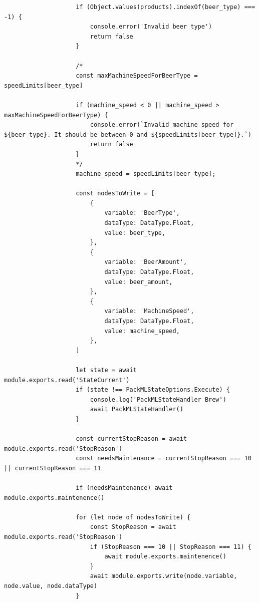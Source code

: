 \begin{center}
\begin{verbatim}
                    if (Object.values(products).indexOf(beer_type) === -1) {
                        console.error('Invalid beer type')
                        return false
                    }

                    /*
                    const maxMachineSpeedForBeerType = speedLimits[beer_type]

                    if (machine_speed < 0 || machine_speed > maxMachineSpeedForBeerType) {
                        console.error(`Invalid machine speed for ${beer_type}. It should be between 0 and ${speedLimits[beer_type]}.`)
                        return false
                    }
                    */
                    machine_speed = speedLimits[beer_type];

                    const nodesToWrite = [
                        {
                            variable: 'BeerType',
                            dataType: DataType.Float,
                            value: beer_type,
                        },
                        {
                            variable: 'BeerAmount',
                            dataType: DataType.Float,
                            value: beer_amount,
                        },
                        {
                            variable: 'MachineSpeed',
                            dataType: DataType.Float,
                            value: machine_speed,
                        },
                    ]

                    let state = await module.exports.read('StateCurrent')
                    if (state !== PackMLStateOptions.Execute) {
                        console.log('PackMLStateHandler Brew')
                        await PackMLStateHandler()
                    }

                    const currentStopReason = await module.exports.read('StopReason')
                    const needsMaintenance = currentStopReason === 10 || currentStopReason === 11

                    if (needsMaintenance) await module.exports.maintenence()

                    for (let node of nodesToWrite) {
                        const StopReason = await module.exports.read('StopReason')
                        if (StopReason === 10 || StopReason === 11) {
                            await module.exports.maintenence()
                        }
                        await module.exports.write(node.variable, node.value, node.dataType)
                    }


\end{verbatim}
\end{center}
